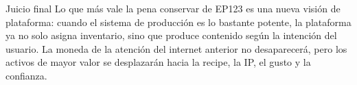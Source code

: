 \begin{importantbox}{Juicio final}
Lo que más vale la pena conservar de EP123 es una nueva visión de plataforma: cuando el sistema de producción es lo bastante potente, la plataforma ya no solo asigna inventario, sino que produce contenido según la intención del usuario. La moneda de la atención del internet anterior no desaparecerá, pero los activos de mayor valor se desplazarán hacia la recipe, la IP, el gusto y la confianza.
\end{importantbox}


